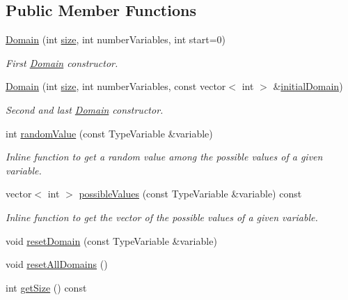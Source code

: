 \subsection*{Public Member Functions}
\begin{DoxyCompactItemize}
\item 
\hyperlink{classghost_1_1Domain_a8bf75e526b2ee95ccb32701175e3a43b}{Domain} (int \hyperlink{classghost_1_1Domain_a13e282f60c6c7cddf5b5716b45ad161c}{size}, int number\-Variables, int start=0)
\begin{DoxyCompactList}\small\item\em First \hyperlink{classghost_1_1Domain}{Domain} constructor. \end{DoxyCompactList}\item 
\hyperlink{classghost_1_1Domain_a26d7b928aa7a0bc44a47f2f407402ed7}{Domain} (int \hyperlink{classghost_1_1Domain_a13e282f60c6c7cddf5b5716b45ad161c}{size}, int number\-Variables, const vector$<$ int $>$ \&\hyperlink{classghost_1_1Domain_a8890ca1323c293a4a1e2aa1830eff043}{initial\-Domain})
\begin{DoxyCompactList}\small\item\em Second and last \hyperlink{classghost_1_1Domain}{Domain} constructor. \end{DoxyCompactList}\item 
int \hyperlink{classghost_1_1Domain_abd3f0bd85c98e66c025e0ff3532af8dd}{random\-Value} (const Type\-Variable \&variable)
\begin{DoxyCompactList}\small\item\em Inline function to get a random value among the possible values of a given variable. \end{DoxyCompactList}\item 
vector$<$ int $>$ \hyperlink{classghost_1_1Domain_abeb28b48f75473162d0aecab6da070d3}{possible\-Values} (const Type\-Variable \&variable) const 
\begin{DoxyCompactList}\small\item\em Inline function to get the vector of the possible values of a given variable. \end{DoxyCompactList}\item 
void \hyperlink{classghost_1_1Domain_a2165237b435a5cb4dfd8584680fcfe05}{reset\-Domain} (const Type\-Variable \&variable)
\item 
void \hyperlink{classghost_1_1Domain_aa014a06ba46e4e057ed182d328a72e97}{reset\-All\-Domains} ()
\item 
int \hyperlink{classghost_1_1Domain_af6950190ced9110a04bde5321337d14d}{get\-Size} () const 

\end{DoxyCompactItemize}
